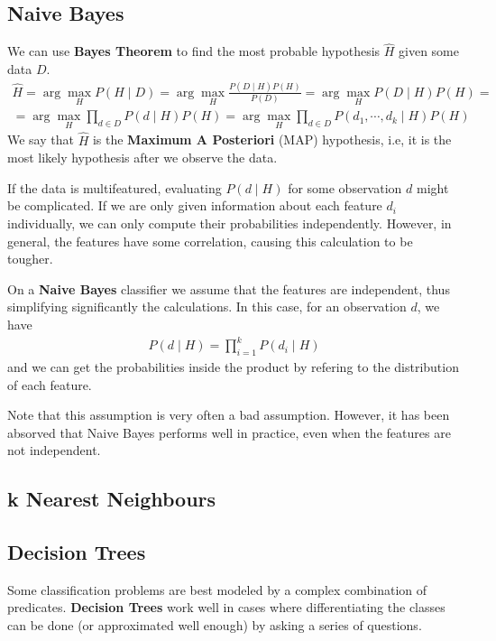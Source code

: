 \documentclass{article}
\begin{document}
\subsection{Naive Bayes}

We can use \textbf{Bayes Theorem} to find the most probable hypothesis $\hat{H}$ given some data $D$.
\begin{gather*}
\hat{H} = \arg \max_{H} P(H \mid D) = \arg \max_{H} \frac{P(D \mid H)P(H)}{P(D)} = \arg \max_{H} P(D \mid H)P(H) = \\
= \arg \max_{H} \prod_{d \in D} P(d \mid H)P(H) = \arg \max_{H} \prod_{d \in D} P(d_1, \cdots, d_k \mid H)P(H)
\end{gather*}
We say that $\hat{H}$ is the \textbf{Maximum A Posteriori} (MAP) hypothesis, i.e, it is the most likely hypothesis after we observe the data.

If the data is multifeatured, evaluating $P(d \mid H)$ for some observation $d$ might be complicated.
If we are only given information about each feature $d_i$ individually, we can only compute their probabilities independently.
However, in general, the features have some correlation, causing this calculation to be tougher.

On a \textbf{Naive Bayes} classifier we assume that the features are independent, thus simplifying significantly the calculations.
In this case, for an observation $d$, we have
\begin{gather*}
P(d \mid H) = \prod_{i=1}^k P(d_i \mid H)
\end{gather*}
and we can get the probabilities inside the product by refering to the distribution of each feature.

Note that this assumption is very often a bad assumption.
However, it has been absorved that Naive Bayes performs well in practice, even when the features are not independent.

\subsection{k Nearest Neighbours}

\subsection{Decision Trees}

Some classification problems are best modeled by a complex combination of predicates.
\textbf{Decision Trees} work well in cases where differentiating the classes can be done (or approximated well enough) by asking a series of questions.
\end{document}
